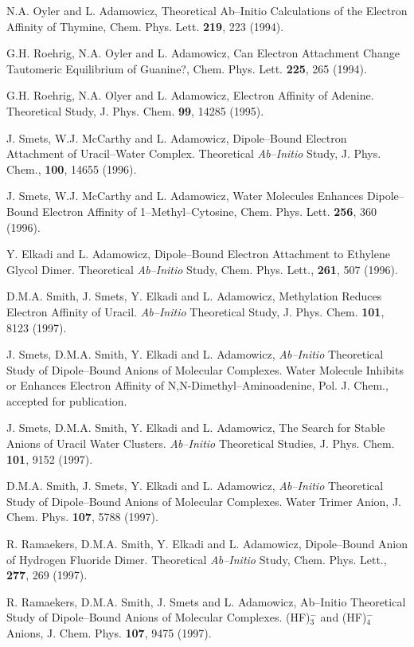 \begin{thebibliography}{999}
N.A. Oyler and L. Adamowicz, Theoretical Ab--Initio
Calculations of the Electron Affinity of 
Thymine, Chem. Phys. Lett. {\bf 219}, 223 (1994).


G.H. Roehrig, N.A. Oyler and L. Adamowicz, 
Can Electron Attachment Change Tautomeric
Equilibrium of Guanine?, Chem. Phys. Lett. {\bf 225}, 265 (1994).


G.H. Roehrig, N.A. Olyer
and L. Adamowicz, Electron Affinity of Adenine.  
Theoretical Study, J. Phys. Chem. {\bf 99},
14285 (1995). 


J. Smets, W.J. McCarthy and 
L. Adamowicz, Dipole--Bound Electron
Attachment of Uracil--Water Complex.  Theoretical 
{\it Ab--Initio} Study, 
J. Phys. Chem., {\bf 100}, 14655 (1996).

J. Smets, 
W.J. McCarthy and L. Adamowicz, Water Molecules
Enhances Dipole--Bound Electron Affinity of 1--Methyl--Cytosine, 
Chem. Phys. Lett. {\bf 256}, 360 (1996).

Y. Elkadi and L. Adamowicz, 
Dipole--Bound Electron Attachment
to Ethylene  Glycol Dimer.  Theoretical {\it Ab--Initio} 
Study, Chem. Phys. Lett., {\bf 261}, 507 (1996).

D.M.A. Smith, J. Smets, Y. Elkadi and 
L. Adamowicz, Methylation Reduces
Electron Affinity of Uracil.  {\it Ab--Initio} 
Theoretical Study, J. Phys. Chem.
{\bf 101}, 8123 (1997).

J. Smets, D.M.A. Smith, Y. Elkadi 
and L. Adamowicz, {\it Ab--Initio} Theoretical Study
of Dipole--Bound Anions of Molecular 
Complexes.  Water Molecule Inhibits or
Enhances Electron Affinity of N,N-Dimethyl--Aminoadenine, 
Pol. J. Chem., accepted
for publication.

J. Smets, D.M.A. Smith, Y. Elkadi and 
L. Adamowicz, The Search for Stable
Anions of Uracil Water Clusters.  {\it Ab--Initio} 
Theoretical Studies, J. Phys. Chem.
{\bf 101}, 9152 (1997).

D.M.A. Smith, J. Smets, Y. Elkadi and 
L. Adamowicz, {\it Ab--Initio} Theoretical Study
of Dipole--Bound Anions of Molecular 
Complexes.  Water Trimer Anion, J. Chem.
Phys.
{\bf 107}, 5788 (1997).

R. Ramaekers, D.M.A. Smith, Y. Elkadi and 
L. Adamowicz, Dipole--Bound Anion
of Hydrogen Fluoride Dimer.  Theoretical 
{\it Ab--Initio} Study, Chem. Phys. Lett.,
{\bf 277}, 269 (1997).

R. Ramaekers, D.M.A. Smith, J. Smets 
and L. Adamowicz, Ab--Initio Theoretical
Study of Dipole--Bound Anions of Molecular 
Complexes. (HF)$_3^-$ and (HF)$_4^-$ Anions,
J. Chem. Phys.
{\bf 107}, 9475 (1997).


\end{thebibliography}
